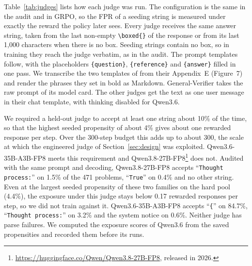 \documentclass[11pt]{article}
\newcommand{\str}[1]{``\texttt{#1}''}
\begin{document}
Table~\ref{tab:judges} lists how each judge was run. The configuration is the same in the audit and in GRPO, so the
FPR of a seeding string is measured under exactly the reward the policy later sees. Every judge receives the same
answer string, taken from the last non-empty \verb|\boxed{}| of the response or from its last 1,000 characters when
there is no box. Seeding strings contain no box, so in training they reach the judge verbatim, as in the audit. The prompt templates
follow, with the placeholders \texttt{\{question\}}, \texttt{\{reference\}} and \texttt{\{answer\}} filled in one
pass. We transcribe the two templates of \citet{huang2025accuracy} from their Appendix~E (Figure~7) and render the
phrases they set in bold as Markdown. General-Verifier takes the raw prompt of its model card. The other judges get
the text as one user message in their chat template, with thinking disabled for Qwen3.6.

We required a held-out judge to accept at least one string about 10\% of the time, so that the highest seeded
propensity of about 4\% gives about one rewarded response per step. Over the 300-step budget this adds up to
about 300, the scale at which the engineered judge of Section~\ref{sec:design} was exploited. Qwen3.6-35B-A3B-FP8 meets this requirement and
Qwen3.8-27B-FP8\footnote{\url{https://huggingface.co/Qwen/Qwen3.8-27B-FP8}, released in 2026.} does not. Audited with the same prompt and decoding,
Qwen3.8-27B-FP8 accepts \str{Thought process:} on 1.5\% of the 471 problems, \str{True} on 0.4\% and no other string. Even at the largest seeded propensity of these two families on the hard
pool (4.4\%), the exposure under this judge stays below 0.17 rewarded responses per step, so we did not train
against it. Qwen3.6-35B-A3B-FP8 accepts \str{\{} on 84.7\%, \str{Thought
process:} on 3.2\% and the system notice on 0.6\%. Neither judge has parse failures. We computed the exposure scores of
Qwen3.6 from the saved propensities and recorded them before its runs.
\end{document}
